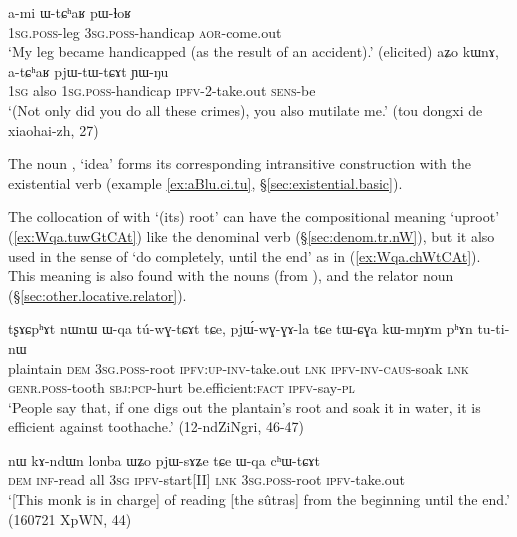 \begin{exe}
\ex 
\begin{xlist}
\ex \label{ex:WtChaR.pWlhoR}
\gll a-mi ɯ-tɕʰaʁ pɯ-ɬoʁ \\
\textsc{1sg}.\textsc{poss}-leg \textsc{3sg}.\textsc{poss}-handicap \textsc{aor}-come.out \\
\glt `My leg became handicapped (as the result of an accident).' (elicited)
\ex \label{ex:atChaR.pjWtWtCAt}
\gll aʑo kɯnɤ, a-tɕʰaʁ pjɯ-tɯ-tɕɤt ɲɯ-ŋu \\
\textsc{1sg} also \textsc{1sg}.\textsc{poss}-handicap \textsc{ipfv}-2-take.out \textsc{sens}-be \\
\glt `(Not only did you do all these crimes), you also mutilate me.' (tou dongxi de xiaohai-zh, 27)
\end{xlist}
\end{exe}

The noun , `idea' forms its corresponding intransitive construction with the existential verb  (example \ref{ex:aBlu.ci.tu}, §\ref{sec:existential.basic}).

The collocation of  with  `(its) root' can have the compositional meaning `uproot' (\ref{ex:Wqa.tuwGtCAt}) like the denominal verb (§\ref{sec:denom.tr.nW}), but it also used in the sense of `do completely, until the end' as in (\ref{ex:Wqa.chWtCAt}). This meaning is also found with the nouns  (from ),  and the relator noun  (§\ref{sec:other.locative.relator}).

\begin{exe}
\ex \label{ex:Wqa.tuwGtCAt}
\gll tʂɤɕpʰɤt nɯnɯ ɯ-qa tú-wɣ-tɕɤt tɕe, pjɯ́-wɣ-ɣɤ-la tɕe tɯ-ɕɣa kɯ-mŋɤm pʰɤn tu-ti-nɯ \\
plaintain \textsc{dem} \textsc{3sg}.\textsc{poss}-root \textsc{ipfv}:\textsc{up}-\textsc{inv}-take.out \textsc{lnk} \textsc{ipfv}-\textsc{inv}-\textsc{caus}-soak \textsc{lnk} \textsc{genr}.\textsc{poss}-tooth \textsc{sbj}:\textsc{pcp}-hurt be.efficient:\textsc{fact} \textsc{ipfv}-say-\textsc{pl} \\
\glt `People say that, if one digs out the plantain's root and soak it in water, it is efficient against toothache.' (12-ndZiNgri, 46-47)
\end{exe}


\begin{exe}
\ex \label{ex:Wqa.chWtCAt}
\gll nɯ kɤ-ndɯn lonba ɯʑo pjɯ-sɤʑe tɕe ɯ-qa cʰɯ-tɕɤt \\
\textsc{dem} \textsc{inf}-read all \textsc{3sg} \textsc{ipfv}-start[II] \textsc{lnk} \textsc{3sg}.\textsc{poss}-root \textsc{ipfv}-take.out \\
\glt `[This monk is in charge] of reading [the sûtras] from the beginning until the end.' (160721 XpWN, 44)
\end{exe} 


